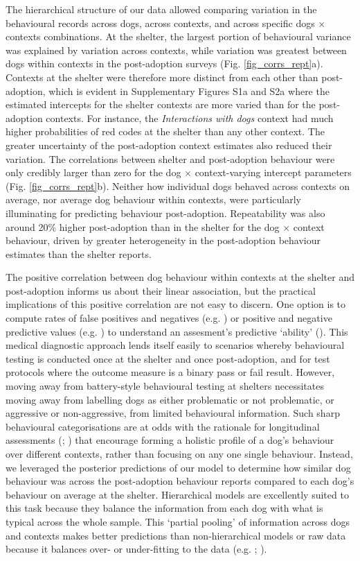 \documentclass[12pt]{article}
\begin{document}
The hierarchical structure of our data allowed comparing variation in the behavioural records across dogs, across contexts, and across specific dogs $\times$ contexts combinations. At the shelter, the largest portion of behavioural variance was explained by variation across contexts, while variation was greatest between dogs within contexts in the post-adoption surveys (Fig. \ref{fig_corrs_rept}a).  
Contexts at the shelter were therefore more distinct from each other than post-adoption, which is evident in Supplementary Figures S1a and S2a where the estimated intercepts for the shelter contexts are more varied than for the post-adoption contexts. For instance, the \textit{Interactions with dogs} context had much higher probabilities of red codes at the shelter than any other context. The greater uncertainty of the post-adoption context estimates also reduced their variation. 
The correlations between shelter and post-adoption behaviour were only credibly larger than zero for the dog $\times$ context-varying intercept parameters (Fig. \ref{fig_corrs_rept}b). Neither how individual dogs behaved across contexts on average, nor average dog behaviour within contexts, were particularly illuminating for predicting behaviour post-adoption. Repeatability was also around 20\% higher post-adoption than in the shelter for the dog $\times$ context behaviour, driven by greater heterogeneity in the post-adoption behaviour estimates than the shelter reports.

The positive correlation between dog behaviour within contexts at the shelter and post-adoption informs us about their linear association, but the practical implications of this positive correlation are not easy to discern. One option is to compute rates of false positives and negatives (e.g. \cite{marder2013}) or positive and negative predictive values (e.g. \cite{patbrad2016}) to understand an assesment's predictive `ability' (\cite{patronek2019}). This medical diagnostic approach lends itself easily to scenarios whereby behavioural testing is conducted once at the shelter and once post-adoption, and for test protocols where the outcome measure is a binary pass or fail result. However, moving away from battery-style behavioural testing at shelters necessitates moving away from labelling dogs as either problematic or not problematic, or aggressive or non-aggressive, from limited behavioural information. Such sharp behavioural categorisations are at odds with the rationale for longitudinal assessments (\cite{ASPCA2018}; \cite{rayment2015}) that encourage forming a holistic profile of a dog's behaviour over different contexts, rather than focusing on any one single behaviour. Instead, we leveraged the posterior predictions of our model to determine how similar dog behaviour was across the post-adoption behaviour reports compared to each dog's behaviour on average at the shelter. Hierarchical models are excellently suited to this task because they balance the information from each dog with what is typical across the whole sample. This `partial pooling' of information across dogs and contexts makes better predictions than non-hierarchical models or raw data because it balances over- or under-fitting to the data (e.g. \cite{gelman2007}; \cite{mcelreath2014}).
\end{document}
